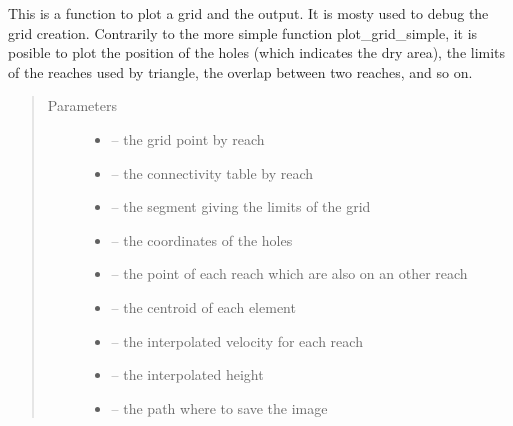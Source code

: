 \documentclass[letterpaper,10pt,english]{sphinxmanual}
\begin{document}
\begin{fulllineitems}
\label{\detokenize{index:src.manage_grid_8.plot_grid}}
This is a function to plot a grid and the output. It is mosty used to debug the grid creation. Contrarily to the more
simple function plot\_grid\_simple, it is posible to plot the position of the holes (which indicates the dry area),
the limits of the reaches used by triangle, the overlap between two reaches, and so on.
\begin{quote}\begin{description}
\item[{Parameters}] \leavevmode\begin{itemize}
\item {} 
 -- the grid point by reach

\item {} 
 -- the connectivity table by reach

\item {} 
 -- the segment giving the limits of the grid

\item {} 
 -- the coordinates of the holes

\item {} 
 -- the point of each reach which are also on an other reach

\item {} 
 -- the centroid of each element

\item {} 
 -- the interpolated velocity for each reach

\item {} 
 -- the interpolated height

\item {} 
 -- the path where to save the image

\end{itemize}

\end{description}\end{quote}

\end{fulllineitems}
\end{document}
